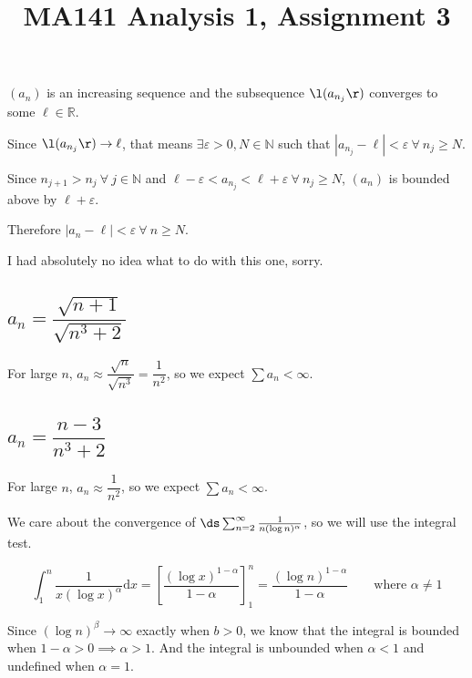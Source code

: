 \documentclass[a4paper]{article}
\title{MA141 Analysis 1, Assignment 3}
\begin{document}
\maketitle

\setlength{\parindent}{0em}
\setlength{\parskip}{1em}


$(a_n)$ is an increasing sequence and the subsequence $\l(a_{n_j}\r)$ converges to some $\ell \in \mathbb R$.

Since $\l(a_{n_j}\r) \to \ell$, that means $\exists \varepsilon > 0, N \in \mathbb N$ such that $|a_{n_j} - \ell| < \varepsilon\ \forall\ n_j \ge N$.

Since $n_{j+1} > n_j\ \forall\ j \in \mathbb N$ and $\ell - \varepsilon < a_{n_j} < \ell + \varepsilon\ \forall\ n_j \ge N$, $(a_n)$ is bounded above by $\ell + \varepsilon$.

Therefore $|a_n - \ell| < \varepsilon\ \forall\ n \ge N$.


I had absolutely no idea what to do with this one, sorry.

\subsection{$a_n = \dfrac{\sqrt{n + 1}}{\sqrt{n^3 + 2}}$}

For large $n$, $a_n \approx \dfrac{\sqrt n}{\sqrt{n^3}} = \dfrac{1}{n^2}$, so we expect $\sum a_n < \infty$.

\subsection{$a_n = \dfrac{n - 3}{n^3 + 2}$}

For large $n$, $a_n \approx \dfrac{1}{n^2}$, so we expect $\sum a_n < \infty$.


We care about the convergence of $\ds\sum_{n=2}^\infty \frac1{n (\log n)^\alpha}$, so we will use the integral test.

$$\int_1^n \frac1{x (\log x)^\alpha} \mathrm d x = \left[ \frac{(\log x)^{1 - \alpha}}{1 - \alpha} \right]_1^n =  \frac{(\log n)^{1 - \alpha}}{1 - \alpha} \qquad \text{where } \alpha \ne 1$$

Since $(\log n)^\beta \to \infty$ exactly when $b > 0$, we know that the integral is bounded when $1 - \alpha > 0 \implies \alpha > 1$. And the integral is unbounded when $\alpha < 1$ and undefined when $\alpha = 1$.
\end{document}
